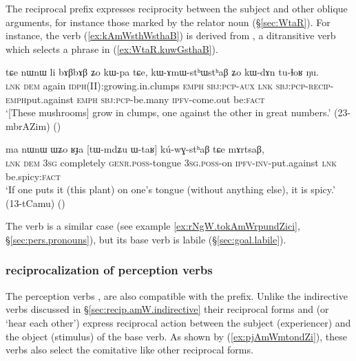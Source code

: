 The reciprocal  prefix expresses reciprocity between the subject and other oblique arguments,  for instance those marked by the relator noun  (§\ref{sec:WtaR}). For instance, the verb  (\ref{ex:kAmWsthWsthaB}) is derived from , a ditransitive verb which selects a phrase in  (\ref{ex:WtaR.kuwGsthaB}).

\begin{exe}
\ex \label{ex:kAmWsthWsthaB}
\gll tɕe nɯnɯ li bɤβbɤβ ʑo kɯ-pa tɕe, kɯ-ɤmɯ-stʰɯ\redp{}stʰaβ ʑo kɯ-dɤn tu-ɬoʁ ŋu. \\
\textsc{lnk} \textsc{dem} again \textsc{idph}(II):growing.in.clumps \textsc{emph} \textsc{sbj}:\textsc{pcp}-\textsc{aux} \textsc{lnk} \textsc{sbj}:\textsc{pcp}-\textsc{recip}-\textsc{emph}\redp{}put.against \textsc{emph} \textsc{sbj}:\textsc{pcp}-be.many \textsc{ipfv}-come.out be:\textsc{fact} \\
\glt `[These mushrooms] grow in clumps, one against the other in great numbers.' (23-mbrAZim)
()
\end{exe}

\begin{exe}
\ex \label{ex:WtaR.kuwGsthaB}
\gll ma nɯnɯ ɯʑo ʁɟa [tɯ-mdʑu ɯ-taʁ] kú-wɣ-stʰaβ tɕe mɤrtsaβ, \\
 \textsc{lnk} \textsc{dem} \textsc{3sg} completely \textsc{genr}.\textsc{poss}-tongue \textsc{3sg}.\textsc{poss}-on \textsc{ipfv}-\textsc{inv}-put.against \textsc{lnk} be.spicy:\textsc{fact} \\
\glt `If one puts it (this plant) on one's tongue (without anything else), it is spicy.' (13-tCamu)
()
\end{exe}

The verb  is a similar case (see example \ref{ex:rNgW.tokAmWrpundZici}, §\ref{sec:pers.pronouns}), but its base verb  is labile (§\ref{sec:goal.labile}).

\subsubsection{ reciprocalization of perception verbs}
The perception verbs ,  are also compatible with the  prefix. Unlike the indirective verbs discussed in §\ref{sec:recip.amW.indirective} their reciprocal forms   and   (or `hear each other') express reciprocal action between the subject (experiencer) and the object (stimulus) of the base verb. As shown by (\ref{ex:pjAmWmtondZi}), these verbs also select the comitative like other reciprocal forms.

